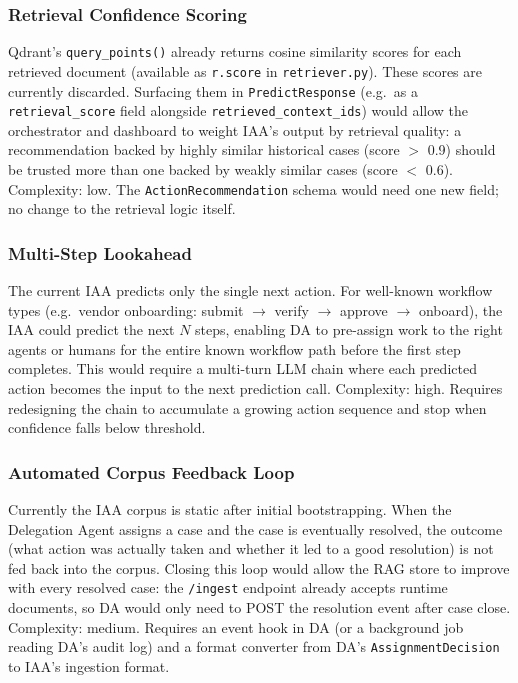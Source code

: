 \documentclass[12pt,a4paper]{article}
\begin{document}
\subsubsection{Retrieval Confidence Scoring}

Qdrant's \texttt{query\_points()} already returns cosine similarity scores for each
retrieved document (available as \texttt{r.score} in \texttt{retriever.py}). These
scores are currently discarded. Surfacing them in \texttt{PredictResponse} (e.g.\ as
a \texttt{retrieval\_score} field alongside \texttt{retrieved\_context\_ids}) would
allow the orchestrator and dashboard to weight IAA's output by retrieval quality:
a recommendation backed by highly similar historical cases (score $>$ 0.9) should be
trusted more than one backed by weakly similar cases (score $<$ 0.6). Complexity: low.
The \texttt{ActionRecommendation} schema would need one new field; no change to the
retrieval logic itself.

\subsubsection{Multi-Step Lookahead}

The current IAA predicts only the single next action. For well-known workflow types
(e.g.\ vendor onboarding: submit $\to$ verify $\to$ approve $\to$ onboard), the IAA
could predict the next $N$ steps, enabling DA to pre-assign work to the right agents
or humans for the entire known workflow path before the first step completes. This
would require a multi-turn LLM chain where each predicted action becomes the input
to the next prediction call. Complexity: high. Requires redesigning the chain to
accumulate a growing action sequence and stop when confidence falls below threshold.

\subsubsection{Automated Corpus Feedback Loop}

Currently the IAA corpus is static after initial bootstrapping. When the Delegation
Agent assigns a case and the case is eventually resolved, the outcome (what action
was actually taken and whether it led to a good resolution) is not fed back into the
corpus. Closing this loop would allow the RAG store to improve with every resolved
case: the \texttt{/ingest} endpoint already accepts runtime documents, so DA would
only need to POST the resolution event after case close. Complexity: medium.
Requires an event hook in DA (or a background job reading DA's audit log) and a
format converter from DA's \texttt{AssignmentDecision} to IAA's ingestion format.
\end{document}
